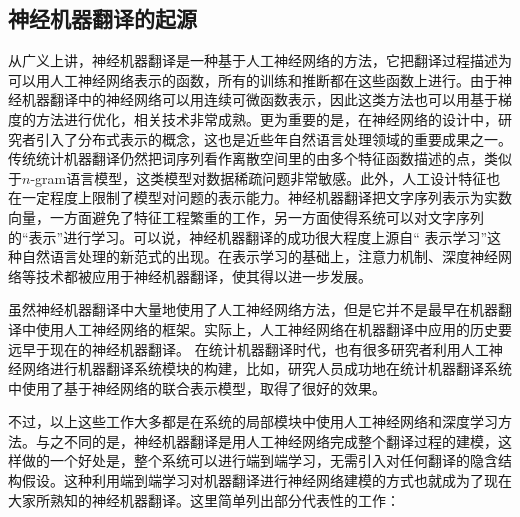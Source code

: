 
\subsection{神经机器翻译的起源}

\parinterval 从广义上讲，神经机器翻译是一种基于人工神经网络的方法，它把翻译过程描述为可以用人工神经网络表示的函数，所有的训练和推断都在这些函数上进行。由于神经机器翻译中的神经网络可以用连续可微函数表示，因此这类方法也可以用基于梯度的方法进行优化，相关技术非常成熟。更为重要的是，在神经网络的设计中，研究者引入了分布式表示的概念，这也是近些年自然语言处理领域的重要成果之一。传统统计机器翻译仍然把词序列看作离散空间里的由多个特征函数描述的点，类似于$n$-gram语言模型，这类模型对数据稀疏问题非常敏感。此外，人工设计特征也在一定程度上限制了模型对问题的表示能力。神经机器翻译把文字序列表示为实数向量，一方面避免了特征工程繁重的工作，另一方面使得系统可以对文字序列的“表示”进行学习。可以说，神经机器翻译的成功很大程度上源自“ 表示学习”这种自然语言处理的新范式的出现。在表示学习的基础上，注意力机制、深度神经网络等技术都被应用于神经机器翻译，使其得以进一步发展。

\parinterval 虽然神经机器翻译中大量地使用了人工神经网络方法，但是它并不是最早在机器翻译中使用人工神经网络的框架。实际上，人工神经网络在机器翻译中应用的历史要远早于现在的神经机器翻译。 在统计机器翻译时代，也有很多研究者利用人工神经网络进行机器翻译系统模块的构建，比如，研究人员成功地在统计机器翻译系统中使用了基于神经网络的联合表示模型，取得了很好的效果。

\parinterval 不过，以上这些工作大多都是在系统的局部模块中使用人工神经网络和深度学习方法。与之不同的是，神经机器翻译是用人工神经网络完成整个翻译过程的建模，这样做的一个好处是，整个系统可以进行端到端学习，无需引入对任何翻译的隐含结构假设。这种利用端到端学习对机器翻译进行神经网络建模的方式也就成为了现在大家所熟知的神经机器翻译。这里简单列出部分代表性的工作：

